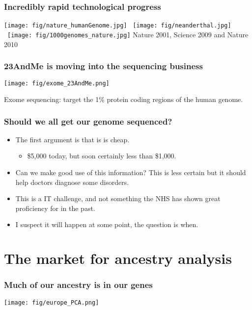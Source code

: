 \documentclass{beamer}
\begin{document}
\begin{frame}
  \frametitle{Incredibly rapid technological progress}
  \texttt{[image: fig/nature\_humanGenome.jpg]} \ 
  \texttt{[image: fig/neanderthal.jpg]} \
  \texttt{[image: fig/1000genomes\_nature.jpg]}
  \vspace{1cm}
  Nature 2001, Science 2009 and Nature 2010
\end{frame}


\begin{frame}
   \frametitle{23AndMe is moving into the sequencing business}
   \begin{center}
     \texttt{[image: fig/exome\_23AndMe.png]}
   \end{center}
   Exome sequencing: target the 1\% protein coding regions of the human genome.
\end{frame}



\begin{frame}
  \frametitle{Should we all get our genome sequenced?}
  \begin{itemize}
  \item The first argument is that is is cheap.
    \begin{itemize}
    \item \$5,000 today, but soon certainly less than \$1,000.
    \end{itemize}
  \item Can we make good use of this information? This is less certain but it should help doctors diagnose some disorders.
  \item This is a IT challenge, and not something the NHS has shown great proficiency for in the past.
  \item I suspect it will happen at some point, the question is when.
  \end{itemize}
\end{frame}





\section{The market for ancestry analysis}

\begin{frame}
  \frametitle{Much of our ancestry is in our genes}
  \begin{center}
    \texttt{[image: fig/europe\_PCA.png]}
  \end{center}
\end{frame}
\end{document}
